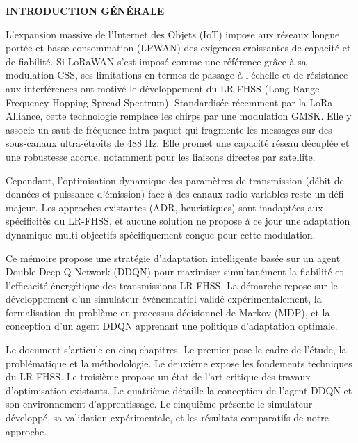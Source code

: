 \begin{center}
	{\Large \textbf{INTRODUCTION GÉNÉRALE}}
\end{center}

	


\vspace{0.5cm}
L'expansion massive de l'Internet des Objets (IoT) impose aux réseaux longue portée et basse consommation (LPWAN) des exigences croissantes de capacité et de fiabilité. Si LoRaWAN s'est imposé comme une référence grâce à sa modulation CSS, ses limitations en termes de passage à l'échelle et de résistance aux interférences ont motivé le développement du LR-FHSS (Long Range – Frequency Hopping Spread Spectrum). Standardisée récemment par la LoRa Alliance, cette technologie remplace les chirps par une modulation GMSK. Elle y associe un saut de fréquence intra-paquet qui fragmente les messages sur des sous-canaux ultra-étroits de 488 Hz. Elle promet une capacité réseau décuplée et une robustesse accrue, notamment pour les liaisons directes par satellite.

Cependant, l'optimisation dynamique des paramètres de transmission (débit de données et puissance d'émission) face à des canaux radio variables reste un défi majeur. Les approches existantes (ADR, heuristiques) sont inadaptées aux spécificités du LR-FHSS, et aucune solution ne propose à ce jour une adaptation dynamique multi-objectifs spécifiquement conçue pour cette modulation.

Ce mémoire propose une stratégie d'adaptation intelligente basée sur un agent Double Deep Q-Network (DDQN) pour maximiser simultanément la fiabilité et l'efficacité énergétique des transmissions LR-FHSS. La démarche repose sur le développement d'un simulateur événementiel validé expérimentalement, la formalisation du problème en processus décisionnel de Markov (MDP), et la conception d'un agent DDQN apprenant une politique d'adaptation optimale.

Le document s'articule en cinq chapitres. Le premier pose le cadre de l'étude, la problématique et la méthodologie. Le deuxième expose les fondements techniques du LR-FHSS. Le troisième propose un état de l'art critique des travaux d'optimisation existants. Le quatrième détaille la conception de l'agent DDQN et son environnement d'apprentissage. Le cinquième présente le simulateur développé, sa validation expérimentale, et les résultats comparatifs de notre approche.